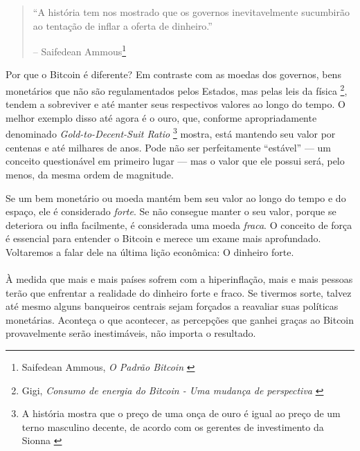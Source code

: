 \begin{quotation}\begin{samepage}
\enquote{A história tem nos mostrado que os governos inevitavelmente sucumbirão ao
tentação de inflar a oferta de dinheiro.}
\begin{flushright} -- Saifedean Ammous\footnote{Saifedean Ammous, \textit{O Padrão Bitcoin} \cite{bitcoin-standard}}
\end{flushright}\end{samepage}\end{quotation}

\newpage

Por que o Bitcoin é diferente? Em contraste com as moedas dos governos, bens monetários que não são regulamentados pelos Estados, mas pelas leis da física \footnote{Gigi, \textit{Consumo de energia do Bitcoin - Uma mudança de perspectiva} \cite {gigi:energy}}, tendem a sobreviver e até manter seus respectivos valores ao longo do tempo. O melhor exemplo disso até agora é o ouro, que, conforme apropriadamente denominado \textit{Gold-to-Decent-Suit Ratio} \footnote{A história mostra que o preço de uma onça de ouro é igual ao preço de um terno masculino decente, de acordo com os gerentes de investimento da Sionna \cite{web:gold-to-decent-suite-ratio}} mostra, está mantendo seu valor por centenas e até milhares de anos. Pode não ser perfeitamente \enquote{estável} --- um conceito questionável em primeiro lugar --- mas o valor que ele possui será, pelo menos, da mesma ordem de magnitude.

Se um bem monetário ou moeda mantém bem seu valor ao longo do tempo e do espaço, ele é considerado \textit{forte}. Se não consegue manter o seu valor, porque se deteriora ou infla facilmente, é considerada uma moeda \textit{fraca}. O conceito de força é essencial para entender o Bitcoin e merece um exame mais aprofundado. Voltaremos a falar dele na última lição econômica: O dinheiro forte.

\paragraph{}
À medida que mais e mais países sofrem com a hiperinflação, mais e mais pessoas terão que enfrentar a realidade do dinheiro forte e fraco. Se tivermos sorte, talvez até mesmo alguns banqueiros centrais sejam forçados a reavaliar suas políticas monetárias. Aconteça o que acontecer, as percepções que ganhei graças ao Bitcoin provavelmente serão inestimáveis, não importa o resultado.

